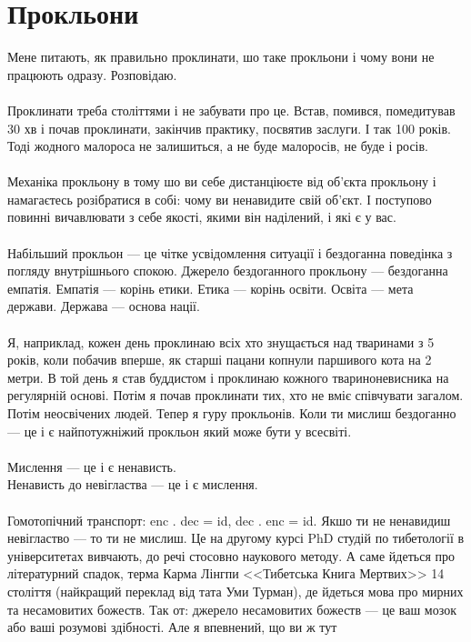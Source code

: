 \section{Прокльони}

Мене питають, як правильно проклинати, шо таке прокльони і чому вони
не працюють одразу. Розповідаю.
\\
\\
Проклинати треба століттями і не забувати про це. Встав, помився, помедитував
30 хв і почав проклинати, закінчив практику, посвятив заслуги. І так 100 років.
Тоді жодного малороса не залишиться, а не буде малоросів, не буде і росів.
\\
\\
Механіка прокльону в тому шо ви себе дистанціюєте від об'єкта прокльону і
намагаєтесь розібратися в собі: чому ви ненавидите свій об'єкт. І поступово
повинні вичавлювати з себе якості, якими він наділений, і які є у вас.
\\
\\
Набільший прокльон --- це чітке усвідомлення ситуації і бездоганна поведінка
з погляду внутрішнього спокою. Джерело бездоганного прокльону --- бездоганна
емпатія. Емпатія --- корінь етики. Етика --- корінь освіти. Освіта --- мета
держави. Держава --- основа нації.
\\
\\
Я, наприклад, кожен день проклинаю всіх хто знущається над тваринами з 5 років,
коли побачив вперше, як старші пацани копнули паршивого кота на 2 метри. В той
день я став буддистом і проклинаю кожного твариноневисника на регулярній основі.
Потім я почав проклинати тих, хто не вміє співчувати загалом. Потім неосвічених
людей. Тепер я гуру прокльонів. Коли ти мислиш бездоганно --- це і є
найпотужніжий прокльон який може бути у всесвіті.
\\
\\
Мислення --- це і є ненависть.\\
Ненависть до невігластва --- це і є мислення.
\\
\\
Гомотопічний транспорт: enc . dec = id, dec . enc = id. Якшо ти не
ненавидиш невігластво --- то ти не мислиш. Це на другому курсі PhD
студій по тибетології в університетах вивчають, до речі стосовно
наукового методу. А саме йдеться про літературний спадок, терма
Карма Лінгпи <<Тибетська Книга Мертвих>> 14 століття (найкращий
переклад від тата Уми Турман), де йдеться мова про мирних та
несамовитих божеств. Так от: джерело несамовитих божеств --- це ваш
мозок або ваші розумові здібності. Але я впевнений, що ви ж тут
